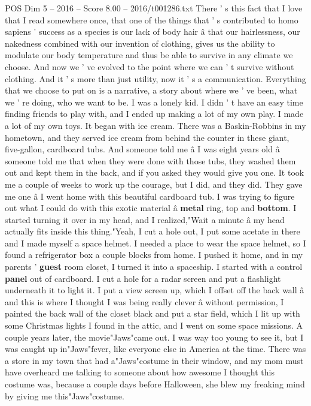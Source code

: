\begin{textsample}{POS Dim 5 – 2016 – Score 8.00 – 2016/t001286.txt}  \label{ex:f5_pos_055}
There ' s this fact that I love that I read somewhere once, that one of the things that ' s contributed to homo sapiens ' success as a species is our lack of body hair â that our hairlessness, our nakedness combined with our invention of clothing, gives us the ability to modulate our body temperature and thus be able to survive in any climate we choose.
And now we ' ve evolved to the point where we can ' t survive without clothing.
And it ' s more than just utility, now it ' s a communication.
Everything that we choose to put on is a narrative, a story about where we ' ve been, what we ' re doing, who we want to be.
I was a lonely kid.
I didn ' t have an easy time finding friends to play with, and I ended up making a lot of my own play.
I made a lot of my own toys.
It began with ice cream.
There was a Baskin-Robbins in my hometown, and they served ice cream from behind the counter in these giant, five-gallon, cardboard tubs.
And someone told me â I was eight years old â someone told me that when they were done with those tubs, they washed them out and kept them in the back, and if you asked they would give you one.
It took me a couple of weeks to work up the courage, but I did, and they did.
They gave me one â I went home with this beautiful cardboard tub.
I was trying to figure out what I could do with this exotic material â \textbf{metal} ring, top and \textbf{bottom}.
I started turning it over in my head, and I realized,"Wait a minute â my head actually fits inside this thing."Yeah, I cut a hole out, I put some acetate in there and I made myself a space helmet.
I needed a place to wear the space helmet, so I found a refrigerator box a couple blocks from home.
I pushed it home, and in my parents ' \textbf{guest} room closet, I turned it into a spaceship.
I started with a control \textbf{panel} out of cardboard.
I cut a hole for a radar screen and put a flashlight underneath it to light it.
I put a view screen up, which I offset off the back wall â and this is where I thought I was being really clever â without permission, I painted the back wall of the closet black and put a star field, which I lit up with some Christmas lights I found in the attic, and I went on some space missions.
A couple years later, the movie"Jaws"came out.
I was way too young to see it, but I was caught up in"Jaws"fever, like everyone else in America at the time.
There was a store in my town that had a"Jaws"costume in their window, and my mom must have overheard me talking to someone about how awesome I thought this costume was, because a couple days before Halloween, she blew my freaking mind by giving me this"Jaws"costume.

\end{textsample}
